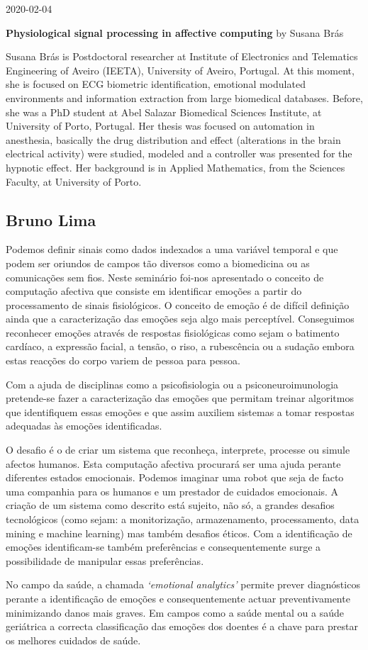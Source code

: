 \documentclass[]{book}
\begin{document}
2020-02-04

\textbf{Physiological signal processing in affective computing} by Susana Brás

Susana Brás is Postdoctoral researcher at Institute of Electronics and Telematics
Engineering of Aveiro (IEETA), University of Aveiro, Portugal.
At this moment, she is focused on ECG biometric identification, emotional
modulated environments and information extraction from large biomedical databases.
Before, she was a PhD student at Abel Salazar Biomedical Sciences Institute, at
University of Porto, Portugal. Her thesis was focused on automation in anesthesia,
basically the drug distribution and effect (alterations in the brain electrical activity) were studied, modeled and a controller was presented for the hypnotic effect.
Her background is in Applied Mathematics, from the Sciences Faculty, at University of
Porto.

\hypertarget{bruno-lima}{%
\subsection{Bruno Lima}\label{bruno-lima}}

Podemos definir sinais como dados indexados a uma variável temporal e que podem ser oriundos de campos tão diversos como a biomedicina ou as comunicações sem fios.
Neste seminário foi-nos apresentado o conceito de computação afectiva que consiste em identificar emoções a partir do processamento de sinais fisiológicos. O conceito de emoção é de difícil definição ainda que a caracterização das emoções seja algo mais perceptível. Conseguimos reconhecer emoções através de respostas fisiológicas como sejam o batimento cardíaco, a expressão facial, a tensão, o riso, a rubescência ou a sudação embora estas reacções do corpo variem de pessoa para pessoa.

Com a ajuda de disciplinas como a psicofisiologia ou a psiconeuroimunologia pretende-se fazer a caracterização das emoções que permitam treinar algoritmos que identifiquem essas emoções e que assim auxiliem sistemas a tomar respostas adequadas às emoções identificadas.

O desafio é o de criar um sistema que reconheça, interprete, processe ou simule afectos humanos. Esta computação afectiva procurará ser uma ajuda perante diferentes estados emocionais. Podemos imaginar uma robot que seja de facto uma companhia para os humanos e um prestador de cuidados emocionais.
A criação de um sistema como descrito está sujeito, não só, a grandes desafios tecnológicos (como sejam: a monitorização, armazenamento, processamento, data mining e machine learning) mas também desafios éticos. Com a identificação de emoções identificam-se também preferências e consequentemente surge a possibilidade de manipular essas preferências.

No campo da saúde, a chamada \emph{`emotional analytics'} permite prever diagnósticos perante a identificação de emoções e consequentemente actuar preventivamente minimizando danos mais graves. Em campos como a saúde mental ou a saúde geriátrica a correcta classificação das emoções dos doentes é a chave para prestar os melhores cuidados de saúde.


\end{document}
